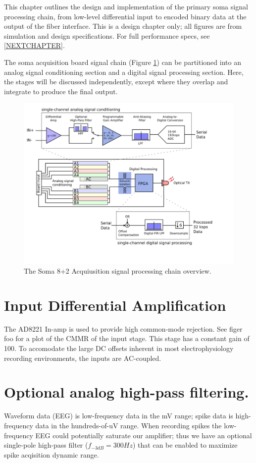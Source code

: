 
This chapter outlines the design and implementation of the primary
soma signal processing chain, from low-level differential input to
encoded binary data at the output of the fiber interface. This is a
design chapter only; all figures are from simulation and design
specifications. For full performance specs, see \ref{NEXTCHAPTER}.

The soma acquisition board signal chain (Figure \ref{signalchain}) can
be partitioned into an analog signal conditioning section and a
digital signal processing section. Here, the stages will be discussed
independently, except where they overlap and integrate to produce the
final output.
\begin{figure}
  \begin{center}
    \includegraphics[scale=1.0]{signalchain.svg}
    \caption{The Soma 8+2 Acquiusition signal processing chain
      overview.}
    \label{signalchain}
  \end{center}
\end{figure}

\section{Input Differential Amplification}

The AD8221 In-amp is used to provide high common-mode rejection. See
figer foo for a plot of the CMMR of the input stage. This stage has a
constant gain of 100.  To accomodate the large DC offsets inherent in
most electrophysiology recording environments, the inputs are
AC-coupled.


\section{Optional analog high-pass filtering.}
Waveform data (EEG) is low-frequency data in the mV range; spike data
is high-frequency data in the hundreds-of-uV range. When recording
spikes the low-frequency EEG could potentially saturate our amplifier;
thus we have an optional single-pole high-pass filter ($f_{-3dB}=300
Hz$) that can be enabled to maximize spike acqisition dynamic range.

